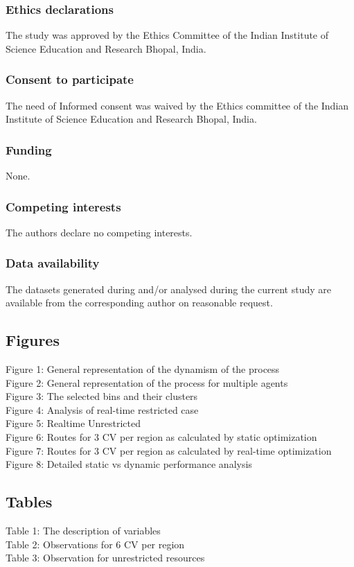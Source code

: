 \documentclass[12pt]{article}
\begin{document}
\subsubsection*{Ethics declarations}
The study was approved by the Ethics Committee of the Indian Institute of Science Education and
Research Bhopal, India.
\subsubsection*{Consent to participate}
The need of Informed consent was waived by the Ethics committee of the Indian Institute of Science
Education and Research Bhopal, India.
\subsubsection*{Funding}
None.
\subsubsection*{Competing interests}
The authors declare no competing interests.
\subsubsection*{Data availability}
The datasets generated during and/or analysed during the current study are available from the corresponding
author on reasonable request.

\printbibliography

\subsection*{Figures}
Figure 1: General representation of the dynamism of the process\\
Figure 2: General representation of the process for multiple agents\\
Figure 3: The selected bins and their clusters\\
Figure 4: Analysis of real-time restricted case\\
Figure 5: Realtime Unrestricted\\
Figure 6: Routes for 3 CV per region as calculated by static optimization\\
Figure 7: Routes for 3 CV per region as calculated by real-time optimization\\
Figure 8: Detailed static vs dynamic performance analysis\\

\subsection*{Tables}
Table 1: The description of variables\\
Table 2: Observations for 6 CV per region\\
Table 3: Observation for unrestricted resources\\
\end{document}

